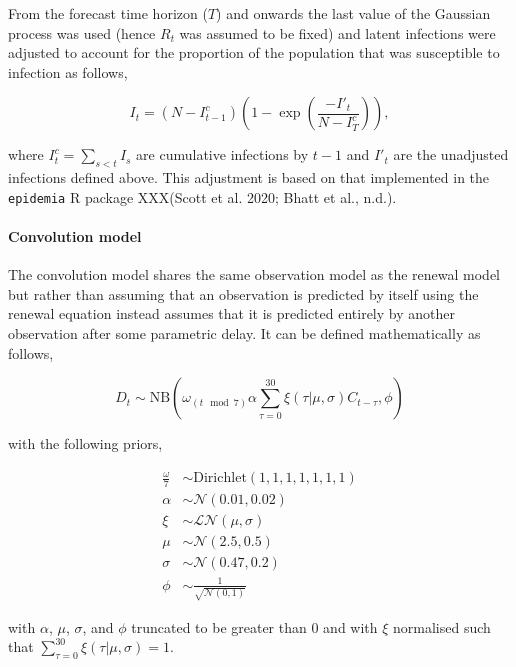 From the forecast time horizon (\(T\)) and onwards the last value of the Gaussian process was used (hence \(R_t\) was assumed to be fixed) and latent infections were adjusted to account for the proportion of the population that was susceptible to infection as follows,

\begin{equation}
    I_t = (N - I^c_{t-1}) \left(1 - \exp \left(\frac{-I'_t}{N - I^c_{T}}\right)\right),
\end{equation}

where \(I^c_t = \sum_{s< t} I_s\) are cumulative infections by \(t-1\) and \(I'_t\) are the unadjusted infections defined above. This adjustment is based on that implemented in the \texttt{epidemia} R package \citep{epidemia, bhattSemiMechanisticBayesianModeling2023} XXX(Scott et al. 2020; Bhatt et al., n.d.).

\hypertarget{convolution-model}{%
\paragraph{Convolution model}\label{convolution-model}}

The convolution model shares the same observation model as the renewal model but rather than assuming that an observation is predicted by itself using the renewal equation instead assumes that it is predicted entirely by another observation after some parametric delay. It can be defined mathematically as follows,

\begin{equation} 
    D_{t} \sim \mathrm{NB}\left(\omega_{(t \mod 7)} \alpha \sum_{\tau = 0}^{30} \xi(\tau | \mu, \sigma) C_{t-\tau},  \phi \right)
\end{equation}

with the following priors,

\begin{align}
    \frac{\omega}{7} &\sim \mathrm{Dirichlet}(1, 1, 1, 1, 1, 1, 1) \\
    \alpha &\sim \mathcal{N}(0.01, 0.02) \\
    \xi &\sim \mathcal{LN}(\mu, \sigma) \\
    \mu &\sim \mathcal{N}(2.5, 0.5) \\
\sigma &\sim \mathcal{N}(0.47, 0.2) \\
\phi &\sim \frac{1}{\sqrt{\mathcal{N}(0, 1)}}
\end{align}

with \(\alpha\), \(\mu\), \(\sigma\), and \(\phi\) truncated to be greater than 0 and with \(\xi\) normalised such that \(\sum_{\tau = 0}^{30} \xi(\tau | \mu, \sigma) = 1\).

